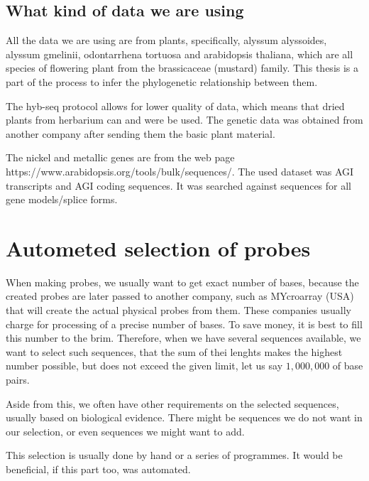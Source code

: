 
\subsection{What kind of data we are using}
All the data we are using are from plants, specifically, alyssum alyssoides, alyssum gmelinii, odontarrhena tortuosa and arabidopsis thaliana, 
which are all species of flowering plant from the brassicaceae (mustard) family. This thesis is a part of the process to infer the phylogenetic 
relationship between them. 

The hyb-seq protocol allows for lower quality of data, which means that dried plants from herbarium can and were be used. The genetic data was obtained from 
another company after sending them the basic plant material. 

The nickel and metallic genes are from the web page https://www.arabidopsis.org/tools/bulk/sequences/. The used dataset was AGI transcripts and AGI coding sequences. 
It was searched against sequences for all gene models/splice forms. 

\section{Autometed selection of probes}

When making probes, we usually want to get exact number of bases, because the created probes are later passed to another 
company, such as MYcroarray (USA) \cite{mycroarray} that will create the actual physical probes from them. These companies 
usually charge for processing of a precise number of bases. To save money, it is best to fill this number to the brim. 
Therefore, when we have several sequences available, we want to select such sequences, that the sum of thei lenghts makes the 
highest number possible, but does not exceed the given limit, let us say $1,000,000$ of base pairs. 

Aside from this, we often have other requirements on the selected sequences, usually based on biological evidence. There might be 
sequences we do not want in our selection, or even sequences we might want to add. 

This selection is usually done by hand or a series of programmes. It would be beneficial, if this part too, was automated. 

